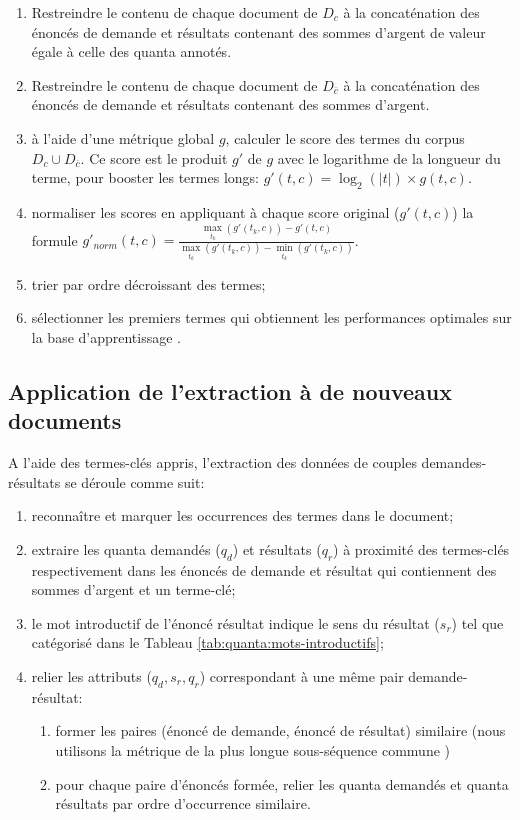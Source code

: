  \begin{enumerate}
 	\item Restreindre le contenu de chaque document de $D_c$ à la concaténation des énoncés de demande et résultats contenant des sommes d'argent de valeur égale à celle des quanta annotés.
 	\item Restreindre le contenu de chaque document de  $D_{\overline{c}}$ à la concaténation des énoncés  de demande et résultats contenant des sommes d'argent.
 	\item à l'aide d'une métrique global $g$, calculer le score des termes du corpus $D_c \cup D_{\overline{c}}$. Ce score est le produit $g'$ de $g$ avec le logarithme de la longueur du terme, pour booster les termes longs: $g'(t,c) = \log_2(\vert t \vert) \times g(t, c)$.
 	\item normaliser les scores en appliquant à chaque score original ($g'(t,c)$) la formule $g'_{norm}(t,c) = \frac{\max\limits_{t_k} (g'(t_k,c)) - g'(t,c)}{\max\limits_{t_k} (g'(t_k,c)) - \min\limits_{t_k} (g'(t_k,c))}$. 
 	\item trier par ordre décroissant des termes;
 	\item sélectionner les premiers termes qui obtiennent les performances optimales sur la base d'apprentissage .
 \end{enumerate}


\subsection{Application de l'extraction à de nouveaux documents}
A l'aide des termes-clés appris, l'extraction des données de couples demandes-résultats se déroule comme suit:
\begin{enumerate}
	\item reconnaître et marquer les occurrences des termes dans le document;
	\item extraire les quanta demandés ($q_d$) et résultats ($q_r$) à proximité des termes-clés respectivement dans les énoncés de demande et résultat qui contiennent des sommes d'argent et un terme-clé;
	\item le mot introductif de l'énoncé résultat indique le sens du résultat ($s_r$) tel que catégorisé dans le Tableau \ref{tab:quanta:mots-introductifs};
	\item relier les attributs ($q_d, s_r, q_r$) correspondant à une même pair demande-résultat:%
	\begin{enumerate}
		\item former les paires (énoncé de demande, énoncé de résultat) similaire (nous utilisons la métrique de \og la plus longue sous-séquence commune \fg{} \citep{bakkelund2009lcs}) 
		\item pour chaque paire d'énoncés formée, relier les quanta demandés et quanta résultats par ordre d'occurrence similaire.
	\end{enumerate}
\end{enumerate}


